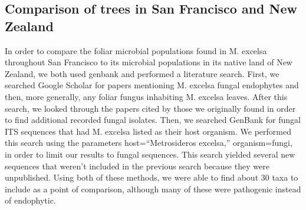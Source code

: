 \documentclass[fleqn,10pt,lineno]{wlpeerj} %
\begin{document}
\hypertarget{comparison-of-trees-in-san-francisco-and-new-zealand}{%
\subsection{Comparison of trees in San Francisco and New
Zealand}\label{comparison-of-trees-in-san-francisco-and-new-zealand}}

In order to compare the foliar microbial populations found in M. excelsa
throughout San Francisco to its microbial populations in its native land
of New Zealand, we both used genbank and performed a literature search.
First, we searched Google Scholar for papers mentioning M. excelsa
fungal endophytes and then, more generally, any foliar fungus inhabiting
M. excelsa leaves. After this search, we looked through the papers cited
by those we originally found in order to find additional recorded fungal
isolates. Then, we searched GenBank for fungal ITS sequences that had M.
excelsa listed as their host organism. We performed this search using
the parameters host=``Metrosideros excelsa,'' organism=fungi, in order
to limit our results to fungal sequences. This search yielded several
new sequences that weren't included in the previous search because they
were unpublished. Using both of these methods, we were able to find
about 30 taxa to include as a point of comparison, although many of
these were pathogenic instead of endophytic.
\end{document}
